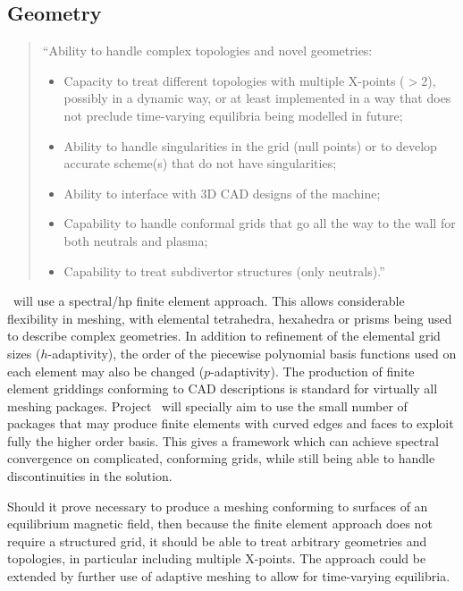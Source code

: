 \subsection{Geometry}\label{sec:geometry}

\begin{quote}
``Ability to handle complex topologies and novel geometries:
\begin{itemize}
\item Capacity to treat different topologies with multiple X-points ($>$2),
	possibly in a dynamic way, or at least implemented in a way that does
	not preclude time-varying equilibria being modelled in future; 
\item Ability to handle singularities in the grid (null points) or to develop
	accurate scheme(s) that do not have singularities;
\item Ability to interface with 3D CAD designs of the machine; 
\item Capability to handle conformal grids that go all the way to the wall for
	both neutrals and plasma; 
\item Capability to treat subdivertor structures (only neutrals).''
\end{itemize}
\end{quote}

\nep\ will use a spectral/hp finite element approach.
This allows considerable flexibility in meshing, with elemental tetrahedra,
hexahedra or prisms being used to describe complex geometries.
In addition to refinement of the elemental grid sizes ($h$-adaptivity),
the order of the piecewise polynomial basis functions used on each element may
also be changed ($p$-adaptivity).
The production of finite element griddings conforming to CAD descriptions is standard
for virtually all meshing packages. Project \nep \ will specially aim to use
the small number of packages that may produce finite elements with curved edges and faces 
to exploit fully the higher order basis.
This gives a framework which can achieve spectral convergence on complicated, conforming grids,
while still being able to handle discontinuities in the solution.

Should it prove necessary to produce a meshing conforming to
surfaces of an equilibrium magnetic field, then because
the finite element approach does not require a structured grid, it should
be able to treat arbitrary geometries and topologies, 
in particular including multiple X-points.
The approach could be extended by further use of adaptive meshing to allow for time-varying equilibria.

